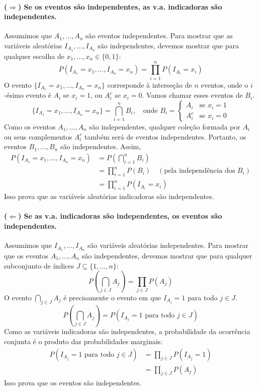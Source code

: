 \documentclass[12pt]{article}
\begin{document}
\paragraph{($\Rightarrow$) Se os eventos são independentes, as v.a. indicadoras são independentes.}
Assumimos que $A_1, \dots, A_n$ são eventos independentes. Para mostrar que as variáveis aleatórias $I_{A_1}, \dots, I_{A_n}$ são independentes, devemos mostrar que para qualquer escolha de $x_1, \dots, x_n \in \{0,1\}$:
\[ P(I_{A_1}=x_1, \dots, I_{A_n}=x_n) = \prod_{i=1}^{n} P(I_{A_i}=x_i) \]
O evento $\{I_{A_1}=x_1, \dots, I_{A_n}=x_n\}$ corresponde à interseção de $n$ eventos, onde o $i$-ésimo evento é $A_i$ se $x_i=1$, ou $A_i^c$ se $x_i=0$. Vamos chamar esses eventos de $B_i$.
\[ \{I_{A_1}=x_1, \dots, I_{A_n}=x_n\} = \bigcap_{i=1}^n B_i, \quad \text{onde } B_i = \begin{cases} A_i & \text{se } x_i=1 \\ A_i^c & \text{se } x_i=0 \end{cases} \]
Como os eventos $A_1, \dots, A_n$ são independentes, qualquer coleção formada por $A_i$ ou seus complementos $A_i^c$ também será de eventos independentes. Portanto, os eventos $B_1, \dots, B_n$ são independentes.
Assim,
\begin{align*}
    P(I_{A_1}=x_1, \dots, I_{A_n}=x_n) &= P\left(\bigcap_{i=1}^n B_i\right) \\
    &= \prod_{i=1}^n P(B_i) \quad (\text{pela independência dos } B_i) \\
    &= \prod_{i=1}^n P(I_{A_i}=x_i)
\end{align*}
Isso prova que as variáveis aleatórias indicadoras são independentes.

\paragraph{($\Leftarrow$) Se as v.a. indicadoras são independentes, os eventos são independentes.}
Assumimos que $I_{A_1}, \dots, I_{A_n}$ são variáveis aleatórias independentes. Para mostrar que os eventos $A_1, \dots, A_n$ são independentes, devemos mostrar que para qualquer subconjunto de índices $J \subseteq \{1, \dots, n\}$:
\[ P\left(\bigcap_{j \in J} A_j\right) = \prod_{j \in J} P(A_j) \]
O evento $\bigcap_{j \in J} A_j$ é precisamente o evento em que $I_{A_j}=1$ para todo $j \in J$.
\[ P\left(\bigcap_{j \in J} A_j\right) = P(I_{A_j}=1 \text{ para todo } j \in J) \]
Como as variáveis indicadoras são independentes, a probabilidade da ocorrência conjunta é o produto das probabilidades marginais:
\begin{align*}
    P(I_{A_j}=1 \text{ para todo } j \in J) &= \prod_{j \in J} P(I_{A_j}=1) \\
    &= \prod_{j \in J} P(A_j)
\end{align*}
Isso prova que os eventos são independentes. \hfill \qedsymbol
\end{document}
